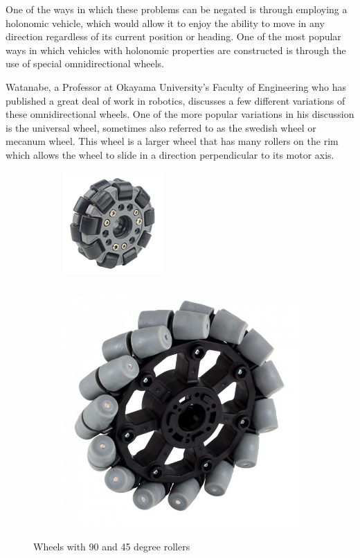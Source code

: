 			One of the ways in which these problems can be negated is through employing a holonomic vehicle, which would allow it to enjoy the ability to move in any direction regardless of its current position or heading. One of the most popular ways in which vehicles with holonomic properties are constructed is through the use of special omnidirectional wheels.
				
			Watanabe\citep{watanabe1998control}, a Professor at Okayama University's Faculty of Engineering who has published a great deal of work in robotics, discusses a few different variations of these omnidirectional wheels. One of the more popular variations in his discussion is the universal wheel, sometimes also referred to as the swedish wheel or mecanum wheel. This wheel is a larger wheel that has many rollers on the rim which allows the wheel to slide in a direction perpendicular to its motor axis. 
				
			\begin{figure}[h]
				\centering
				\begin{subfigure}{.5\textwidth}
					\centering
					\includegraphics[width=.4\linewidth]{ANALYSIS/90degwheel.png}
				\end{subfigure}
				\begin{subfigure}{.5\textwidth}
					\centering
					\includegraphics[width=.4\linewidth]{ANALYSIS/45degwheel.jpg}
				\end{subfigure}
				\caption{Wheels with 90 and 45 degree rollers}
				\label{fig:omnidirectionalwheels}
			\end{figure}
		
